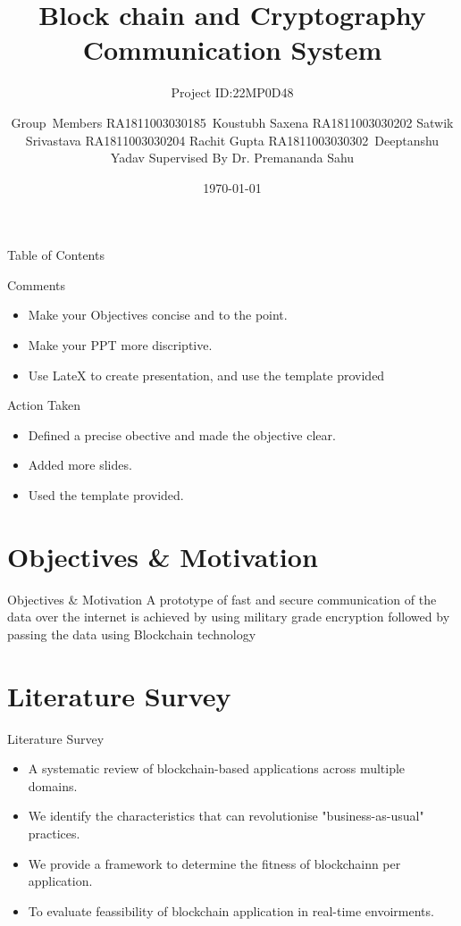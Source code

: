 \documentclass{beamer}
\title[22MP0D48]{Block chain and Cryptography Communication System}
\subtitle{Project ID:22MP0D48\\}
\author[Review -II]{Group~Members RA1811003030185~Koustubh Saxena RA1811003030202 Satwik Srivastava  RA1811003030204 Rachit Gupta RA1811003030302~Deeptanshu Yadav  {Supervised By Dr. Premananda Sahu}}
\institute[]{Department of Computer Science \& Engineerin Faculty of Engineering \& Technolog SRM Institute of Science \& Technology}
\date{\today}
\begin{document}
	\begin{frame}
		\maketitle
		\date{}
	\end{frame}
	\begin{frame}[allowframebreaks]{Table of Contents}
		\tableofcontents[sections={1-7}]
		\tableofcontents[sections={8-10}]
	\end{frame}
	
	\begin{frame}{Comments}
		\LARGE
		\begin{itemize}
			\item Make your Objectives concise and to the point.
			\item Make your PPT more discriptive.
			\item Use LateX to create presentation, and use the template provided
			\medskip
		\end{itemize}
	\end{frame}
	\begin{frame}{Action Taken}
		\begin{itemize}
			\LARGE
			\item Defined a precise obective and made the objective clear.
			\item Added more slides.
			\item Used the template provided.
		\end{itemize}
	\end{frame}

	\section{Objectives \& Motivation}
	\begin{frame}{Objectives \& Motivation}
		\LARGE
	A prototype of fast and secure communication of the data over the internet is achieved by using military grade encryption followed by passing the data using Blockchain technology	
	\end{frame}

	\section{Literature Survey}
	\begin{frame}{Literature Survey}
	\bigskip
	\normalsize
		\begin{itemize}
			\item A systematic review of blockchain-based applications across multiple domains.
			\medskip
			\item We identify the characteristics that can revolutionise "business-as-usual" practices.
			\medskip
			\item We provide a framework to determine the fitness of blockchainn per application.
			\medskip
			\item  To evaluate feassibility of blockchain application in real-time envoirments. 
		\end{itemize}
	\end{frame}
	
\end{document}
